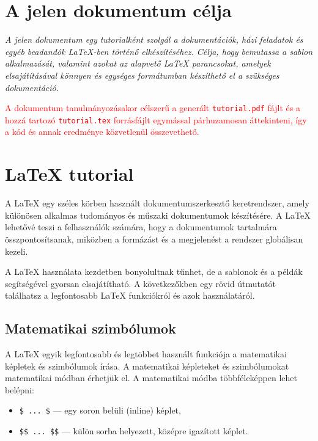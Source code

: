 \documentclass[fleqn,12pt]{article}
\begin{document}



\section{A jelen dokumentum célja}

    \emph{A jelen dokumentum egy tutorialként szolgál a dokumentációk, házi feladatok és egyéb beadandók \LaTeX-ben történő elkészítéséhez. Célja, hogy bemutassa a sablon alkalmazását, valamint azokat az alapvető \LaTeX{} parancsokat, amelyek elsajátításával könnyen és egységes formátumban készíthető el a szükséges dokumentáció.}

    \vspace{0.5em}
    \textcolor{red}{A dokumentum tanulmányozásakor célszerű a generált \texttt{tutorial.pdf} fájlt és a hozzá tartozó \texttt{tutorial.tex} forrásfájlt egymással párhuzamosan áttekinteni, így a kód és annak eredménye közvetlenül összevethető.}


\section{\LaTeX{} tutorial}

    A \LaTeX{} egy széles körben használt dokumentumszerkesztő keretrendszer, amely különösen alkalmas tudományos és műszaki dokumentumok készítésére. A \LaTeX{} lehetővé teszi a felhasználók számára, hogy a dokumentumok tartalmára összpontosítsanak, miközben a formázást és a megjelenést a rendszer globálisan kezeli.

    \vspace{0.5em}
    A \LaTeX{} használata kezdetben bonyolultnak tűnhet, de a sablonok és a példák segítségével gyorsan elsajátítható. A következőkben egy rövid útmutatót találhatsz a legfontosabb \LaTeX{} funkciókról és azok használatáról.

    \subsection{Matematikai szimbólumok}

        A \LaTeX{} egyik legfontosabb és legtöbbet használt funkciója a matematikai képletek és szimbólumok írása. A matematikai képleteket és szimbólumokat matematikai módban érhetjük el. A matematikai módba többféleképpen lehet belépni:
        \begin{itemize}
            \item \texttt{\$ ... \$} --- egy soron belüli (inline) képlet,
            \item \texttt{\$\$ ... \$\$} --- külön sorba helyezett, középre igazított képlet.
        \end{itemize}
\end{document}
